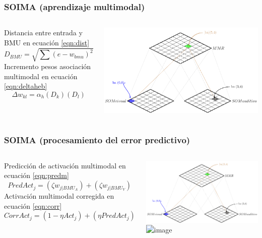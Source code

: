 \documentclass{beamer}
\begin{document}
\begin{frame}
\frametitle{SOIMA (aprendizaje multimodal)}
\begin{columns}
\begin{tiny}
Distancia entre entrada y BMU en ecuación \ref{eqn:dist}
\begin{equation}\label{eqn:dist}
D_{BMU}=\sqrt{\displaystyle\sum (e-w_{bmu})^{2}}
\end{equation}
Incremento pesos asociación multimodal en ecuación \ref{eqn:deltaheb}
  \begin{equation}\label{eqn:deltaheb}
    \Delta w_{kl}= \alpha_{h}(D_{k})(D_{l})
  \end{equation}
 \end{tiny}
\includegraphics[width=\textwidth]{images/soima3}
\end{columns}
\end{frame}

\begin{frame}
\frametitle{SOIMA (procesamiento del error predictivo)}
\begin{columns}
\begin{tiny}
Predicción de activación multimodal en ecuación \ref{eqn:predm}
\begin{equation}\label{eqn:predm}
 PredAct_{j}=(\zeta w_{j|BMU_{A}})+(\zeta w_{j|BMU_{V}})
\end{equation}
Activación multimodal corregida en ecuación \ref{eqn:corr}
\begin{equation}\label{eqn:corr}
 CorrAct_{j}=(1-\eta Act_{j})+(\eta PredAct_{j})
\end{equation}
\end{tiny}
\includegraphics<1>[width=\textwidth]{images/soima3}
\includegraphics<2>[width=\textwidth]{images/soima4}
\end{columns}
\end{frame}


\end{document}
